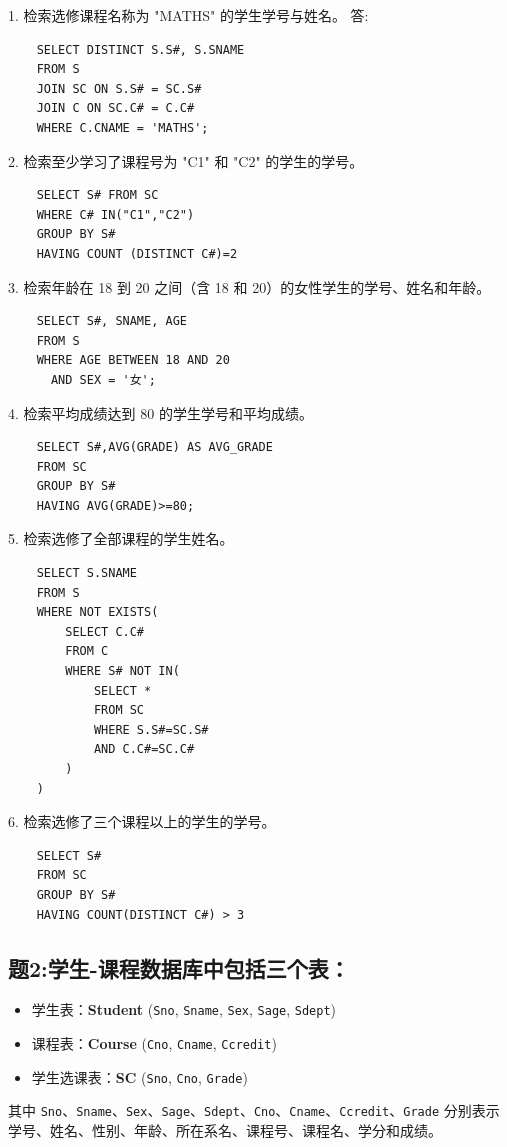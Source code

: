 \documentclass[a4paper,12pt,UTF8,fontset=none]{ctexart}
\begin{document}
1. 检索选修课程名称为 "MATHS" 的学生学号与姓名。
答:\begin{lstlisting}
    SELECT DISTINCT S.S#, S.SNAME
    FROM S
    JOIN SC ON S.S# = SC.S#
    JOIN C ON SC.C# = C.C#
    WHERE C.CNAME = 'MATHS';
\end{lstlisting}
2. 检索至少学习了课程号为 "C1" 和 "C2" 的学生的学号。
\begin{lstlisting}
    SELECT S# FROM SC
    WHERE C# IN("C1","C2")
    GROUP BY S#
    HAVING COUNT (DISTINCT C#)=2
\end{lstlisting}
3. 检索年龄在 18 到 20 之间（含 18 和 20）的女性学生的学号、姓名和年龄。
\begin{lstlisting}
    SELECT S#, SNAME, AGE
    FROM S
    WHERE AGE BETWEEN 18 AND 20
      AND SEX = '女'; 
\end{lstlisting}
4. 检索平均成绩达到 80 的学生学号和平均成绩。
\begin{lstlisting}
    SELECT S#,AVG(GRADE) AS AVG_GRADE
    FROM SC
    GROUP BY S#
    HAVING AVG(GRADE)>=80;
\end{lstlisting}
5. 检索选修了全部课程的学生姓名。
\begin{lstlisting}
    SELECT S.SNAME
    FROM S 
    WHERE NOT EXISTS(
        SELECT C.C#
        FROM C 
        WHERE S# NOT IN(
            SELECT *
            FROM SC
            WHERE S.S#=SC.S#
            AND C.C#=SC.C#
        )
    )
\end{lstlisting}
6. 检索选修了三个课程以上的学生的学号。
\begin{lstlisting}
    SELECT S#
    FROM SC
    GROUP BY S#
    HAVING COUNT(DISTINCT C#) > 3 
\end{lstlisting}
\subsection{题2:学生-课程数据库中包括三个表：}

\begin{itemize}
    \item 学生表：\textbf{Student} (\texttt{Sno}, \texttt{Sname}, \texttt{Sex}, \texttt{Sage}, \texttt{Sdept})
    \item 课程表：\textbf{Course} (\texttt{Cno}, \texttt{Cname}, \texttt{Ccredit})
    \item 学生选课表：\textbf{SC} (\texttt{Sno}, \texttt{Cno}, \texttt{Grade})
\end{itemize}

其中 \texttt{Sno}、\texttt{Sname}、\texttt{Sex}、\texttt{Sage}、\texttt{Sdept}、\texttt{Cno}、\texttt{Cname}、\texttt{Ccredit}、\texttt{Grade} 分别表示学号、姓名、性别、年龄、所在系名、课程号、课程名、学分和成绩。
\end{document}

